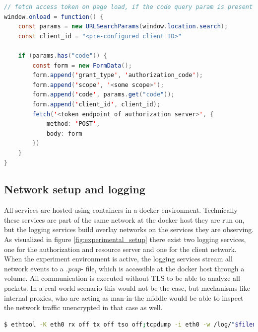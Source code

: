 \begin{minipage}\linewidth
\begin{lstlisting}[language={java}, caption={Example implementation of authorization code handling at the client}, label={lst:redirect_handler}]
// fetch access token on page load, if the code query param is present
window.onload = function() {
	const params = new URLSearchParams(window.location.search);
	const client_id = "<pre-configured client ID>"

	if (params.has("code")) {
		const form = new FormData();
		form.append('grant_type', 'authorization_code');
		form.append('scope', '<some scope>');
		form.append('code', params.get("code"));
		form.append('client_id', client_id);
		fetch('<token endpoint of authorization server>', {
			method: 'POST',
			body: form
		})
	}
}
\end{lstlisting}
\end{minipage}

\subsection{Network setup and logging}
All services are hosted using containers in a docker environment. Technically these services are part of the same network at the docker host they are run on, but the logging services build overlay networks on the services they are observing. As visualized in figure \ref{fig:experimental_setup} there exist two logging services, one for the authorization and resource server and one for the client network. When the experiment environment is active, the logging services stream all network events to a \emph{.pcap}- file, which is accessible at the docker host through a volume. All communication is executed without TLS to be able to analyze all packets. In a real-world scenario this would not be the case, but mechanisms like internal proxies, who are acting as man-in-the middle would be able to inspect the network traffic unencrypted in that case as well.

\begin{minipage}\linewidth
\begin{lstlisting}[language={bash}, caption={Logger process}, label={lst:logging_service}] 
$ ethtool -K eth0 rx off tx off tso off;tcpdump -i eth0 -w /log/"$filename_prefix"-log-$(date +"%Y%m%d_%H-%M-%S").pcap
\end{lstlisting}
\end{minipage}

